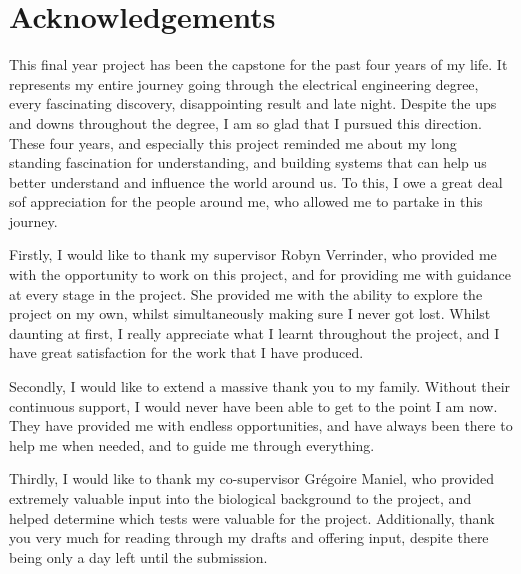 \chapter{Acknowledgements}		
\label{ch:ack}
This final year project has been the capstone for the past four years of my life. It represents my entire journey going through the electrical engineering degree, every fascinating discovery, disappointing result and late night. Despite the ups and downs throughout the degree, I am so glad that I pursued this direction. These four years, and especially this project reminded me about my long standing fascination for understanding, and building systems that can help us better understand and influence the world around us. To this, I owe a great deal sof appreciation for the people around me, who allowed me to partake in this journey.

Firstly, I would like to thank my supervisor Robyn Verrinder, who provided me with the opportunity to work on this project, and for providing me with guidance at every stage in the project. She provided me with the ability to explore the project on my own, whilst simultaneously making sure I never got lost. Whilst daunting at first, I really appreciate what I learnt throughout the project, and I have great satisfaction for the work that I have produced. 

Secondly, I would like to extend a massive thank you to my family. Without their continuous support, I would never have been able to get to the point I am now. They have provided me with endless opportunities, and have always been there to help me when needed, and to guide me through everything. 

Thirdly, I would like to thank my co-supervisor Grégoire Maniel, who provided extremely valuable input into the biological background to the project, and helped determine which tests were valuable for the project. Additionally, thank you very much for reading through my drafts and offering input, despite there being only a day left until the submission.

